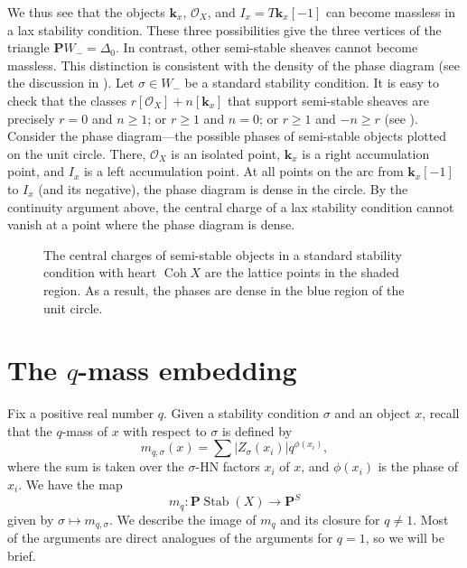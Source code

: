 \documentclass{amsart}
\begin{document}
We thus see that the objects \(\mathbf{k}_x\), \(\mathcal{O}_X\), and \(I_x = T\mathbf{k}_x[-1]\) can become massless in a lax stability condition.
These three possibilities give the three vertices of the triangle \(\mathbf{P}W_- = \Delta_0\).
In contrast, other semi-stable sheaves cannot become massless.
This distinction is consistent with the density of the phase diagram (see the discussion in \cite[\S~12]{bro.pau.plo.ea:22}).
Let \(\sigma \in W_-\) be a standard stability condition.
It is easy to check that the classes \(r [\mathcal{O}_X] + n [\mathbf{k}_x]\) that support semi-stable sheaves are precisely
\(r = 0\) and \(n \geq 1\); or \(r \geq 1\) and \(n = 0\); or \(r \geq 1\) and \(-n \geq r\) (see ).
Consider the phase diagram---the possible phases of semi-stable objects plotted on the unit circle.
There, \(\mathcal{O}_X\) is an isolated point, \(\mathbf{k}_x\) is a right accumulation point, and \(I_x\) is a left accumulation point.
At all points on the arc from \(\mathbf{k}_x[-1]\) to \(I_x\) (and its negative), the phase diagram is dense in the circle.
By the continuity argument above, the central charge of a lax stability condition cannot vanish at a point where the phase diagram is dense.
\begin{figure}
  \centering
\caption{The central charges of semi-stable objects in a standard stability condition with heart \(\operatorname{Coh}X\) are the lattice points in the shaded region.  As a result, the phases are dense in the blue region of the unit circle.}
\label{fig:semistables}
\end{figure}


\section{The \(q\)-mass embedding}\label{sec:qmass}
Fix a positive real number \(q\).
Given a stability condition \(\sigma\) and an object \(x\), recall that the \(q\)-mass of \(x\) with respect to \(\sigma\) is defined by
\[ m_{q, \sigma}(x) = \sum |Z_{\sigma}(x_i)| q^{\phi(x_i)},\]
where the sum is taken over the \(\sigma\)-HN factors \(x_i\) of \(x\), and \(\phi(x_i)\) is the phase of \(x_i\).
We have the map
\[ m_q \colon \mathbf{P} \operatorname{Stab}(X) \to \mathbf{P}^S\]
given by \(\sigma \mapsto m_{q,\sigma}\).
We describe the image of \(m_q\) and its closure for \(q \neq 1\).
Most of the arguments are direct analogues of the arguments for \(q = 1\), so we will be brief.
\end{document}

